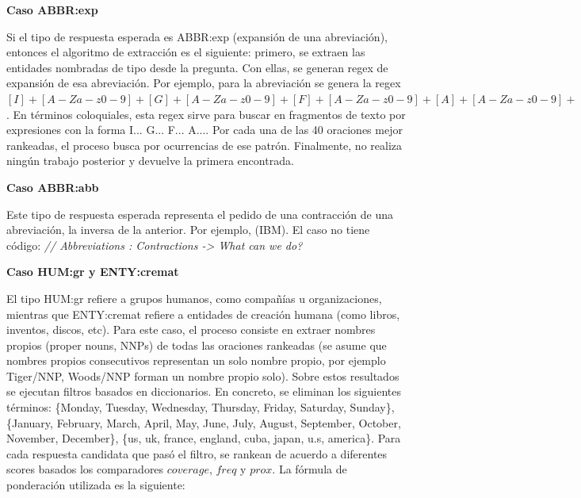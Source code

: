 \textbf{Caso ABBR:exp}\newline

Si el tipo de respuesta esperada es ABBR:exp (expansión de una abreviación), entonces el algoritmo de extracción es el siguiente: primero, se extraen las entidades nombradas de tipo  desde la pregunta. Con ellas, se generan regex de expansión de esa abreviación. Por ejemplo, para la abreviación  se genera la regex $[I]+[A-Za-z0-9]+ [G]+[A-Za-z0-9]+ [F]+[A-Za-z0-9]+ [A]+[A-Za-z0-9]+ $. En términos coloquiales, esta regex sirve para buscar en fragmentos de texto por expresiones con la forma I... G... F... A.... Por cada una de las 40 oraciones mejor rankeadas, el proceso busca por ocurrencias de ese patrón. Finalmente, no realiza ningún trabajo posterior y devuelve la primera encontrada. \newline

\textbf{Caso ABBR:abb}\newline

Este tipo de respuesta esperada representa el pedido de una contracción de una abreviación, la inversa de la anterior. Por ejemplo,  (IBM). El caso no tiene código: \textit{// Abbreviations : Contractions -> What can we do?} \newline

\textbf{Caso HUM:gr y ENTY:cremat} \newline

El tipo HUM:gr refiere a grupos humanos, como compañías u organizaciones, mientras que ENTY:cremat refiere a entidades de creación humana (como libros, inventos, discos, etc).
Para este caso, el proceso consiste en extraer nombres propios (proper nouns, NNPs) de todas las oraciones rankeadas (se asume que nombres propios consecutivos representan un solo nombre propio, por ejemplo Tiger/NNP, Woods/NNP forman un nombre propio solo). Sobre estos resultados se ejecutan filtros basados en diccionarios. En concreto, se eliminan los siguientes términos: \{Monday, Tuesday, Wednesday, Thursday, Friday, Saturday, Sunday\}, \{January, February, March, April, May, June, July, August, September, October, November, December\}, \{us, uk, france, england, cuba, japan, u.s, america\}. Para cada respuesta candidata que pasó el filtro, se rankean de acuerdo a diferentes scores basados los comparadores $coverage$, $freq$ y $prox$.
La fórmula de ponderación utilizada es la siguiente: \\

